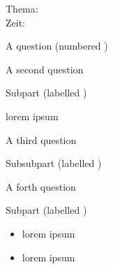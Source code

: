 \documentclass{../../exam2e}
\begin{document}

\begin{klassenarbeitskopf}
	Thema:\\
	Zeit:	
\end{klassenarbeitskopf}


\begin{questions}
\begin{question}
	A question (numbered \thequestion)
\end{question}%

\question A second question
\begin{subparts}
	\subpart Subpart (labelled \thesubpart)
	\begin{subsubparts}
		\subsubpart lorem ipsum
	\end{subsubparts}
\end{subparts}

\clearpage

\question A third question
\begin{subsubparts}
	\subsubpart Subsubpart (labelled \thesubsubpart)
\end{subsubparts}

\question A forth question
\begin{subparts}
	\subpart[4] Subpart (labelled \thesubpart)
	\begin{itemize}
		\item lorem ipsum
		\item lorem ipsum
	\end{itemize}
\end{subparts}


\end{questions}

\clearpage
\addtocounter{page}{-1}
\thispagestyle{empty} 



\end{document}
